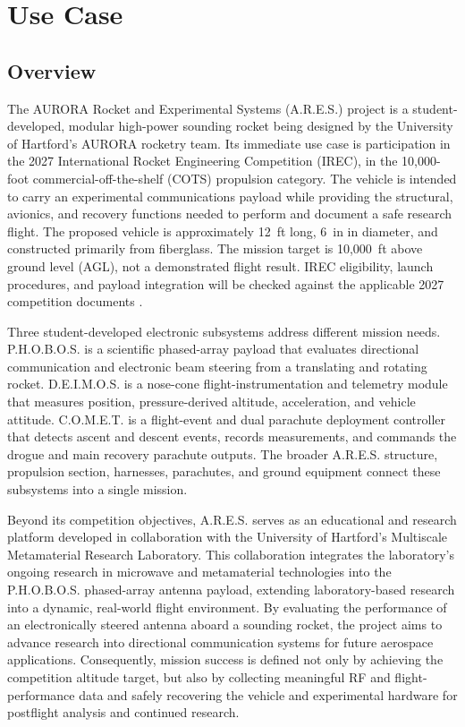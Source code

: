 \documentclass[11pt]{IEEEtran}
\newcommand{\comet}{C.O.M.E.T.}
\newcommand{\ares}{A.R.E.S.}
\newcommand{\phobos}{P.H.O.B.O.S.}
\newcommand{\deimos}{D.E.I.M.O.S.}
\newcommand{\RHeight}{12}
\begin{document}
\onecolumn


%

\tableofcontents
\newpage

\section{Use Case}
\subsection{Overview}
The AURORA Rocket and Experimental Systems (\ares{}) project is a student-developed, modular high-power sounding rocket being designed by the University of Hartford's AURORA rocketry team. Its immediate use case is participation in the 2027 International Rocket Engineering Competition (IREC), in the 10,000-foot commercial-off-the-shelf (COTS) propulsion category. The vehicle is intended to carry an experimental communications payload while providing the structural, avionics, and recovery functions needed to perform and document a safe research flight. The proposed vehicle is approximately \RHeight{}~ft long, 6~in in diameter, and constructed primarily from fiberglass. The mission target is 10,000~ft above ground level (AGL), not a demonstrated flight result. IREC eligibility, launch procedures, and payload integration will be checked against the applicable 2027 competition documents \cite{irecRules,irecGuide}.

Three student-developed electronic subsystems address different mission needs. \phobos{} is a scientific phased-array payload that evaluates directional communication and electronic beam steering from a translating and rotating rocket. \deimos{} is a nose-cone flight-instrumentation and telemetry module that measures position, pressure-derived altitude, acceleration, and vehicle attitude. \comet{} is a flight-event and dual parachute deployment controller that detects ascent and descent events, records measurements, and commands the drogue and main recovery parachute outputs. The broader \ares{} structure, propulsion section, harnesses, parachutes, and ground equipment connect these subsystems into a single mission.

Beyond its competition objectives, A.R.E.S. serves as an educational and research platform developed in collaboration with the University of Hartford's Multiscale Metamaterial Research Laboratory. This collaboration integrates the laboratory's ongoing research in microwave and metamaterial technologies into the P.H.O.B.O.S. phased-array antenna payload, extending laboratory-based research into a dynamic, real-world flight environment. By evaluating the performance of an electronically steered antenna aboard a sounding rocket, the project aims to advance research into directional communication systems for future aerospace applications. Consequently, mission success is defined not only by achieving the competition altitude target, but also by collecting meaningful RF and flight-performance data and safely recovering the vehicle and experimental hardware for postflight analysis and continued research.
\end{document}
